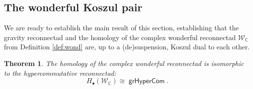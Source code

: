 \documentclass[11pt]{article}
\newtheorem{theorem}[theo]{Theorem}
\theoremstyle{definition}
\numberwithin{equation}{section}
\newcommand\calW{\mathcal{W}}
\DeclareMathOperator{\grHyperCom}{\mathsf{grHyperCom}}
\begin{document}
\subsection{The wonderful Koszul pair}

We are ready to establish the main result of this section, establishing that the gravity reconnectad and the homology of the complex wonderful reconnectad $\calW_{\mathbb{C}}$ from Definition \ref{def:wond} are, up to a (de)suspension, Koszul dual to each other.

\begin{theorem}\label{th:homologyhyper}
The homology of the complex wonderful reconnectad is isomorphic to the hypercommutative reconnectad:
 \[
H_{\bullet}(\calW_{\mathbb{C}}) \cong \grHyperCom.
 \]
\end{theorem}
\end{document}
